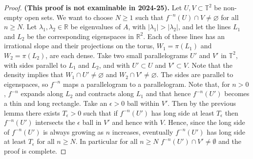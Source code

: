 \documentclass[12pt]{article}
\theoremstyle{definition}
\theoremstyle{remark}
\begin{document}
\begin{proof}
{\bf (This proof is not examinable in 2024-25).}
Let $U,V \subset \mathbb T^2$ be non-empty open sets. We want to choose
$N \ge 1$ such that 
$f^{-n}(U) \cap V \ne \varnothing$ 
for all $n \ge N$. Let
$\lambda_1,\lambda_2 \in \mathbb R$ be eigenvalues of $A$, with $|\lambda_1|>|\lambda_2|$, and
let the lines $L_1$ and $L_2$ be the corresponding eigenspaces in $\mathbb R^2$. 
Each of
these lines has an irrational slope and their projections on the torus, $W_1 = \pi(L_1)$
and $W_2=\pi(L_2)$, are each
dense.
Take two small parallelograms $U'$ and $V'$ in $\mathbb T^2$, with sides parallel to $L_1$ and $L_2$, 
and with $U' \subset U$ and $V' \subset V$.
Note that the density implies that $W_1 \cap U' \ne \varnothing$ and $W_2 \cap V' \ne \varnothing$.
The sides are parallel to
eigenspaces, so $f^{-n}$ maps a parallelogram to a parallelogram. Note that, for $n>0$, $f^{-n}$ expands 
along $L_2$ and contracts along $L_1$ and that hence $f^{-n}(U')$ becomes a thin and long rectangle. Take an $\epsilon >0$ ball within $V'$. Then by the previous lemma there exists $T_\epsilon >0$ such that if $f^{-n}(U')$ has long side at least $T_\epsilon$ then $f^{-n}(U')$ intersects the $\epsilon$ ball in $V'$ and hence with $V$. Hence, since the long side of $f^{-n}(U')$ is always growing as $n$ increases, eventually $f^{-n}(U')$ has long side at least $T_\epsilon$ for all $n\ge N$. In particular for all $n\ge N$ $f^{-n}(U') \cap V' \neq \emptyset$ and the proof is complete.
\end{proof}
\end{document}
